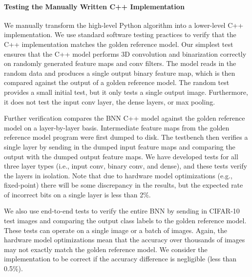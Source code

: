 

\paragraph{Testing the Manually Written C++ Implementation}
We manually transform the high-level Python algorithm into a lower-level
C++ implementation. We use standard software testing practices to verify
that the C++ implementation matches the golden reference model. Our
simplest test ensures that the C++ model performs 3D convolution and
binarization correctly on randomly generated feature maps and conv
filters. The model reads in the random data and produces a single output
binary feature map, which is then compared against the output of a golden
reference model. The random test provides a small initial test, but it
only tests a single output image. Furthermore, it does not test the input
conv layer, the dense layers, or max pooling.

Further verification compares the BNN C++ model against the golden
reference model on a layer-by-layer basis. Intermediate feature maps from
the golden reference model program were first dumped to disk. The
testbench then verifies a single layer by sending in the dumped input
feature maps and comparing the output with the dumped output feature
maps. We have developed tests for all three layer types (i.e., input
conv, binary conv, and dense), and these tests verify the layers in
isolation. Note that due to hardware model optimizations (e.g.,
fixed-point) there will be some discrepancy in the results, but the
expected rate of incorrect bits on a single layer is less than 2\%.

We also use end-to-end tests to verify the entire BNN by sending in
CIFAR-10 test images and comparing the output class labels to the golden
reference model. These tests can operate on a single image or a batch of
images. Again, the hardware model optimizations mean that the accuracy
over thousands of images may not exactly match the golden reference
model. We consider the implementation to be correct if the accuracy
difference is negligible (less than 0.5\%).

